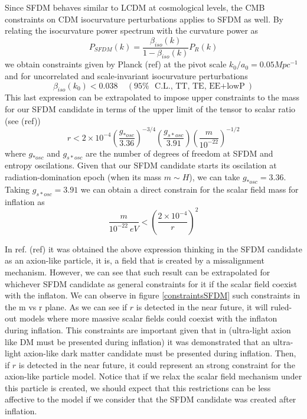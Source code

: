 \documentclass[twocolumn,           %
               showpacs,            %
               preprintnumbers,     %
               aps,                 %
               prl,          	    %
               letterpaper,             %
               superscriptaddress,      %
               nofootinbib,         %
               tightenlines,        %
               floats,floatfix      %
               ,usenatbib,
               ]{revtex4-1}
\begin{document}
Since SFDM behaves similar to LCDM at cosmological levels, the CMB constraints on CDM isocurvature perturbations applies to SFDM as well. By relating the isocurvature power spectrum with the curvature power as
\begin{equation}
P_{SFDM}(k)=\frac{\beta_{iso}(k)}{1-\beta_{iso}(k)}P_R(k)
\end{equation}
we obtain constraints given by Planck (ref) at the pivot scale $k_0/a_0=0.05Mpc^{-1}$ and for uncorrelated and scale-invariant isocurvature perturbations 
\begin{equation}
\beta_{iso}(k_0)<0.038 \ \ \ \ \ (95\%\ \ \text{C.L., TT, TE, EE$+$lowP})
\end{equation}
This last expression can be extrapolated to impose upper constraints to the mass for our SFDM candidate in terms of the upper limit of the tensor to scalar ratio (see (ref))
\begin{equation}
r<2\times 10^{-4}\left(\frac{g_{*osc}}{3.36}\right)^{-3/4}\left(\frac{g_{s*osc}}{3.91}\right)\left(\frac{m}{10^{-22}}\right)^{-1/2}
\end{equation}
where $g_{*osc}$ and $g_{s*osc}$ are the number of degrees of freedom at SFDM and entropy oscilations. Given that our SFDM candidate starts its oscilation at radiation-domination epoch (when its mass $m\sim H$), we can take $g_{*osc}=3.36$. Taking $g_{s*osc}=3.91$ we can obtain a direct constrain for the scalar field mass for inflation as 
\begin{equation}
\frac{m}{10^{-22}\ eV}<\left(\frac{2\times 10^{-4}}{r}\right)^2
\end{equation}

In ref. (ref) it was obtained the above expression thinking in the SFDM candidate as an axion-like particle, it is, a field that is created by a missalignment mechanism. However, we can see that such result can be extrapolated for whichever SFDM candidate as general constraints for it if the scalar field coexist with the inflaton. We can observe in figure \ref{constraintsSFDM} such constraints in the m vs r plane. As we can see if $r$ is detected in the near future, it will ruled-out models where more massive scalar fields could coexist with the inflaton during inflation. This constraints are important given that in (ultra-light axion like DM must be presented during inflation) it was demonstrated that an ultra-light axion-like dark matter candidate must be presented during inflation. Then, if $r$ is detected in the near future, it could represent an strong constraint for the axion-like particle model. Notice that if we relax the scalar field mechanism under this particle is created, we should expect that this restrictions can be less affective to the model if we consider that the SFDM candidate was created after inflation. 
\end{document}
